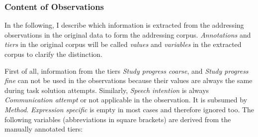 \subsubsection{Content of Observations}\label{sec:addressee-coorpus-content}

In the following, I describe which information is extracted from the addressing observations in the original data to form the \gls{addressing corpus}.
\emph{Annotations} and \emph{tiers} in the original corpus will be called \emph{values} and \emph{variables} in the extracted corpus to clarify the distinction.

First of all, information from the tiers \emph{Study progress coarse}, and \emph{Study progress fine} can not be used in the observations because their values are always the same during task solution attempts.
Similarly, \emph{Speech intention} is always \emph{Communication attempt} or not applicable in the observation.
It is subsumed by \emph{Method}.
\emph{Expression specific} is empty in most cases and therefore ignored too.
The following variables (abbreviations in square brackets) are derived from the manually annotated tiers:
